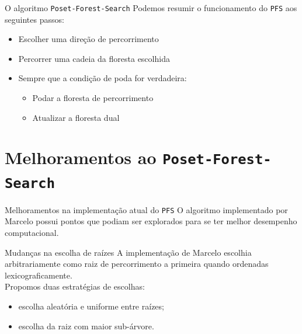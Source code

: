 \documentclass{beamer}
\newcommand{\algname}[1]{\texttt{#1}}
\begin{document}
\begin{frame}{O algoritmo \algname{Poset-Forest-Search}}
Podemos resumir o funcionamento do \algname{PFS} aos seguintes passos:
\pause
\begin{itemize}
  \item{Escolher uma direção de percorrimento}
  \pause
  \item{Percorrer uma cadeia da floresta escolhida}
  \pause
  \item{Sempre que a condição de poda for verdadeira:}
  \pause
    \begin{itemize}
    \item{Podar a floresta de percorrimento}
    \pause
    \item{Atualizar a floresta dual}
    \pause
    \end{itemize}
\end{itemize}
\end{frame}


\section{Melhoramentos ao \algname{Poset-Forest-Search}}


\begin{frame}{Melhoramentos na implementação atual do \algname{PFS}}
  O algoritmo implementado por Marcelo possui pontos que podiam ser
  explorados para se ter melhor desempenho computacional.
\end{frame}


\begin{frame}{Mudanças na escolha de raízes}
A implementação de Marcelo escolhia \alert{arbitrariamente} como raiz de
percorrimento a primeira quando ordenadas lexicograficamente.
\vspace{2em}\\
\pause
Propomos duas estratégias de escolhas:
\begin{itemize}
  \item{escolha aleatória e uniforme entre raízes;}
  \pause
  \item{escolha da raiz com maior sub-árvore.}
\end{itemize}
\end{frame}
\end{document}
